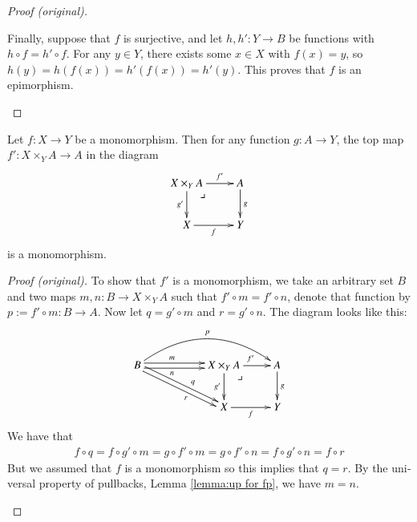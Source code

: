\documentclass{book}
\makeatletter
\def\to{\rightarrow}
\def\taking{\colon}
\def\ullimit{\ar@{}[rd]|(.3)*+{\lrcorner}}
\theoremstyle{theoremENG}
\theoremstyle{lemmaENG}
\theoremstyle{propositionENG}
\newtheorem{propositionENG}[subsubsection]{\begin{english}Proposition\end{english}}
\theoremstyle{corollaryENG}
\theoremstyle{factENG}
\theoremstyle{remarkENG}
\theoremstyle{exampleENG}
\theoremstyle{warningENG}
\theoremstyle{questionENG}
\theoremstyle{guessENG}
\theoremstyle{answerENG}
\theoremstyle{constructionENG}
\theoremstyle{rulesENG}
\theoremstyle{excENG}
\theoremstyle{appENG}
\theoremstyle{definitionENG}
\theoremstyle{notationENG}
\theoremstyle{conjectureENG}
\theoremstyle{postulateENG}
\newenvironment{proofENG}{\begin{proof}[Proof (original)]}{\end{proof}}
\theoremstyle{theoremRUS}
\theoremstyle{lemmaRUS}
\theoremstyle{propositionRUS}
\theoremstyle{corollaryRUS}
\theoremstyle{factRUS}
\theoremstyle{remarkRUS}
\theoremstyle{exampleRUS}
\theoremstyle{warningRUS}
\theoremstyle{questionRUS}
\theoremstyle{guessRUS}
\theoremstyle{answerRUS}
\theoremstyle{constructionRUS}
\theoremstyle{rulesRUS}
\theoremstyle{excRUS}
\theoremstyle{appRUS}
\theoremstyle{definitionRUS}
\theoremstyle{notationRUS}
\theoremstyle{conjectureRUS}
\theoremstyle{postulateRUS}
\makeatother
\begin{document}
\begin{english}
\begin{proofENG}
\begin{russian} \end{russian}

Finally, suppose that $f$ is surjective, and let $h,h'\taking Y\to B$ be functions with $h\circ f=h'\circ f$. For any $y\in Y$, there exists some $x\in X$ with $f(x)=y$, so $h(y)=h(f(x))=h'(f(x))=h'(y)$. This proves that $f$ is an epimorphism.

\begin{russian} \end{russian}

\end{proofENG}

\begin{propositionENG}\label{prop:pb preserve mono}

Let $f\taking X\to Y$ be a monomorphism. Then for any function $g\taking A\to Y$, the top map $f'\taking X\times_YA\to A$ in the diagram
$$
\xymatrix{X\times_YA\ar[r]^-{f'}\ar[d]_{g'}\ullimit&A\ar[d]^g\\X\ar[r]_f&Y}
$$
is a monomorphism.

\begin{russian} \end{russian}

\end{propositionENG}

\begin{proofENG}

To show that $f'$ is a monomorphism, we take an arbitrary set $B$ and two maps $m,n\taking B\to X\times_YA$ such that $f'\circ m=f'\circ n$, denote that function by $p:=f'\circ m\taking B\to A$. Now let $q=g'\circ m$ and $r=g'\circ n$. The diagram looks like this:
$$
\xymatrix{B\ar@<.5ex>[rr]^(.4)m\ar@<-.5ex>[rr]_(.4)n\ar@/^2pc/[rrr]^p\ar@<.5ex>[drr]^(.6)q\ar@<-.5ex>[drr]_(.6)r&&X\times_YA\ar[r]^{f'}\ar[d]_{g'}\ullimit&A\ar[d]^g\\&&X\ar[r]_f&Y}
$$
We have that 
\begin{align*}f\circ q=f\circ g'\circ m=g\circ f'\circ m=g\circ f'\circ n=f\circ g'\circ n=f\circ r\end{align*} 
But we assumed that $f$ is a monomorphism so this implies that $q=r$. By the universal property of pullbacks, Lemma \ref{lemma:up for fp}, we have $m=n$.

\begin{russian} \end{russian}

\end{proofENG}


\end{english}
\end{document}
